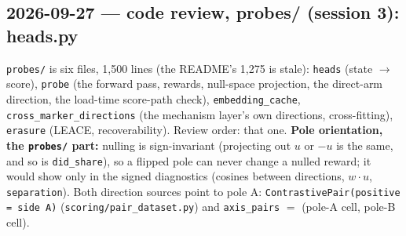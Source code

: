 \documentclass{article}
\begin{document}
\subsection*{2026-09-27 --- code review, probes/ (session 3): heads.py}
\texttt{probes/} is six files, 1{,}500 lines (the README's 1{,}275 is stale): \texttt{heads} (state $\to$ score),
\texttt{probe} (the forward pass, rewards, null-space projection, the direct-arm direction, the load-time
score-path check), \texttt{embedding\_cache}, \texttt{cross\_marker\_directions} (the mechanism layer's own
directions, cross-fitting), \texttt{erasure} (LEACE, recoverability). Review order: that one.
\textbf{Pole orientation, the \texttt{probes/} part:} nulling is sign-invariant (projecting out $u$ or $-u$ is the
same, and so is \texttt{did\_share}), so a flipped pole can never change a nulled reward; it would show only in the
signed diagnostics (cosines between directions, $w\cdot u$, \texttt{separation}). Both direction sources point to
pole A: \texttt{ContrastivePair(positive = side A)} (\texttt{scoring/pair\_dataset.py}) and
\texttt{axis\_pairs} $=$ (pole-A cell, pole-B cell).
\end{document}
